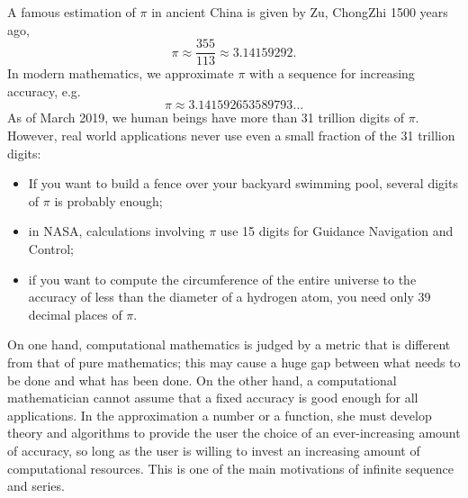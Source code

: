 \begin{exm}[A story of $\pi$]
  A famous estimation of $\pi$ in ancient China
  is given by Zu, ChongZhi 1500 years ago,
  \begin{equation*}
    \pi\approx \frac{355}{113}\approx 3.14159292.
  \end{equation*}
  In modern mathematics,
   we approximate $\pi$ with a sequence
   for increasing accuracy, e.g. 
   \begin{equation}
     \label{eq:pi}
     \pi \approx 3.14159 26535 89793 \ldots
   \end{equation}
  As of March 2019, we human beings have more than 31 trillion digits
  of $\pi$.
  However, real world applications
  never use even a small fraction of the 31 trillion digits:
  \begin{itemize}\itemsep0em
  \item If you want to build a fence over your backyard swimming pool,
    several digits of $\pi$ is probably enough;
  \item in NASA, calculations involving $\pi$
    use 15 digits for Guidance Navigation and Control;
  \item if you want to compute the circumference of the entire universe
    to the accuracy of less than the diameter of a hydrogen atom,
    you need only 39 decimal places of $\pi$.
  \end{itemize}
  

 On one hand, computational mathematics
 is judged by a metric that is different
 from that of pure mathematics;
 this may cause a huge gap
 between what needs to be done and what has been done.
%
On the other hand,
a computational mathematician cannot assume
that a fixed accuracy is good enough
for all applications.
In the approximation a number or a function, 
 she must develop theory and algorithms
 to provide the user the choice of an ever-increasing amount of accuracy, 
 so long as the user is willing
 to invest an increasing amount of computational resources.
This is one of the main motivations of infinite sequence and series.
\end{exm}


